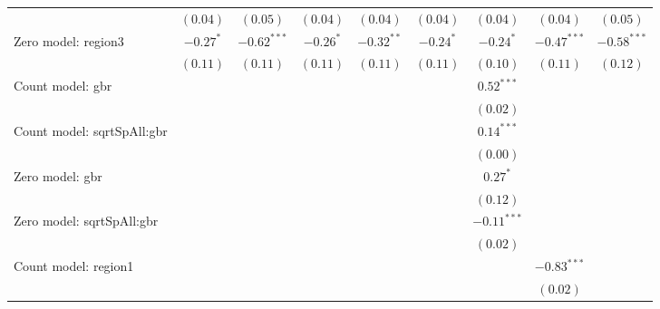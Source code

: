 \begin{sidewaystable}
\begin{center}
{\begin{tabular}{l c c c c c c c c}
                               & $(0.04)$      & $(0.05)$      & $(0.04)$      & $(0.04)$        & $(0.04)$      & $(0.04)$      & $(0.04)$       & $(0.05)$      \\
Zero model: region3            & $-0.27^{*}$   & $-0.62^{***}$ & $-0.26^{*}$   & $-0.32^{**}$    & $-0.24^{*}$   & $-0.24^{*}$   & $-0.47^{***}$  & $-0.58^{***}$ \\
                               & $(0.11)$      & $(0.11)$      & $(0.11)$      & $(0.11)$        & $(0.11)$      & $(0.10)$      & $(0.11)$       & $(0.12)$      \\
Count model: gbr               &               &               &               &                 &               & $0.52^{***}$  &                &               \\
                               &               &               &               &                 &               & $(0.02)$      &                &               \\
Count model: sqrtSpAll:gbr     &               &               &               &                 &               & $0.14^{***}$  &                &               \\
                               &               &               &               &                 &               & $(0.00)$      &                &               \\
Zero model: gbr                &               &               &               &                 &               & $0.27^{*}$    &                &               \\
                               &               &               &               &                 &               & $(0.12)$      &                &               \\
Zero model: sqrtSpAll:gbr      &               &               &               &                 &               & $-0.11^{***}$ &                &               \\
                               &               &               &               &                 &               & $(0.02)$      &                &               \\
Count model: region1           &               &               &               &                 &               &               & $-0.83^{***}$  &               \\
                               &               &               &               &                 &               &               & $(0.02)$       &               \\

\end{tabular}}
\end{center}
\end{sidewaystable}
